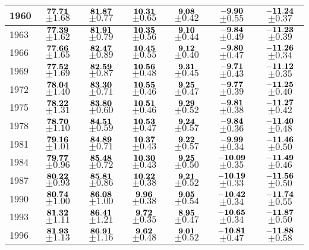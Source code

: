 \documentclass[10pt, titlepage]{article}%
\begin{document}
\begin{table}
\begin{tabular}{||l|c|c|c|c|c|c||}
  1960 &  $\bf 77.71$ $\pm 1.68$& $\bf 81.87$ $\pm 0.77$& $\bf 10.31$ $\pm 0.65$& $\bf 9.08$ $\pm 0.42$& $\bf -9.90$ $\pm 0.55$& $\bf -11.24$ $\pm 0.37$ \\ \hline\hline
  1963 &  $\bf 77.39$ $\pm 1.62$& $\bf 81.91$ $\pm 0.79$& $\bf 10.35$ $\pm 0.56$& $\bf 9.10$ $\pm 0.44$& $\bf -9.84$ $\pm 0.49$& $\bf -11.23$ $\pm 0.39$ \\ \hline\hline
  1966 &  $\bf 77.66$ $\pm 1.65$& $\bf 82.47$ $\pm 0.89$& $\bf 10.45$ $\pm 0.55$& $\bf 9.12$ $\pm 0.40$& $\bf -9.80$ $\pm 0.47$& $\bf -11.26$ $\pm 0.34$ \\ \hline\hline
  1969 &  $\bf 77.52$ $\pm 1.69$& $\bf 82.59$ $\pm 0.87$& $\bf 10.56$ $\pm 0.48$& $\bf 9.31$ $\pm 0.45$& $\bf -9.71$ $\pm 0.43$& $\bf -11.12$ $\pm 0.35$ \\ \hline\hline
  1972 &  $\bf 78.04$ $\pm 1.40$& $\bf 83.30$ $\pm 0.71$& $\bf 10.55$ $\pm 0.46$& $\bf 9.25$ $\pm 0.47$& $\bf -9.77$ $\pm 0.39$& $\bf -11.25$ $\pm 0.40$ \\ \hline\hline
  1975 &  $\bf 78.22$ $\pm 1.31$& $\bf 83.80$ $\pm 0.60$& $\bf 10.51$ $\pm 0.46$& $\bf 9.29$ $\pm 0.52$& $\bf -9.81$ $\pm 0.38$& $\bf -11.27$ $\pm 0.42$ \\ \hline\hline
  1978 &  $\bf 78.70$ $\pm 1.10$& $\bf 84.51$ $\pm 0.59$& $\bf 10.53$ $\pm 0.47$& $\bf 9.24$ $\pm 0.57$& $\bf -9.84$ $\pm 0.36$& $\bf -11.40$ $\pm 0.48$ \\ \hline\hline
  1981 &  $\bf 79.16$ $\pm 1.01$& $\bf 84.89$ $\pm 0.71$& $\bf 10.37$ $\pm 0.43$& $\bf 9.22$ $\pm 0.57$& $\bf -9.99$ $\pm 0.34$& $\bf -11.46$ $\pm 0.50$ \\ \hline\hline
  1984 &  $\bf 79.77$ $\pm 0.96$& $\bf 85.48$ $\pm 0.72$& $\bf 10.30$ $\pm 0.43$& $\bf 9.25$ $\pm 0.50$& $\bf -10.09$ $\pm 0.35$& $\bf -11.49$ $\pm 0.46$ \\ \hline\hline
  1987 &  $\bf 80.22$ $\pm 0.93$& $\bf 85.81$ $\pm 0.86$& $\bf 10.22$ $\pm 0.38$& $\bf 9.21$ $\pm 0.52$& $\bf -10.19$ $\pm 0.33$& $\bf -11.56$ $\pm 0.50$ \\ \hline\hline
  1990 &  $\bf 80.74$ $\pm 1.00$& $\bf 86.08$ $\pm 1.00$& $\bf 9.96$ $\pm 0.38$& $\bf 9.05$ $\pm 0.54$& $\bf -10.42$ $\pm 0.34$& $\bf -11.74$ $\pm 0.55$ \\ \hline\hline
  1993 &  $\bf 81.32$ $\pm 1.11$& $\bf 86.41$ $\pm 1.21$& $\bf 9.72$ $\pm 0.35$& $\bf 8.95$ $\pm 0.47$& $\bf -10.65$ $\pm 0.34$& $\bf -11.87$ $\pm 0.50$ \\ \hline\hline
  1996 &  $\bf 81.93$ $\pm 1.13$& $\bf 86.91$ $\pm 1.16$& $\bf 9.62$ $\pm 0.48$& $\bf 9.01$ $\pm 0.52$& $\bf -10.81$ $\pm 0.47$& $\bf -11.88$ $\pm 0.58$ \\ \hline\hline

\end{tabular}
\end{table}
\end{document}
